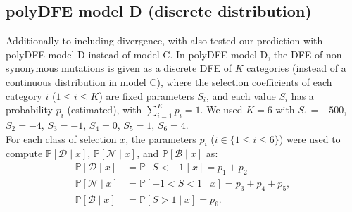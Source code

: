 \documentclass{article}
\newcommand{\proba}{\mathbb{P}}
\newcommand{\Sphyclass}{x}
\newcommand{\given}{\mid}
\newcommand{\Spop}{S}
\newcommand{\SpopDel}{\mathcal{D}}
\newcommand{\SpopNeu}{\mathcal{N}}
\newcommand{\SpopBen}{\mathcal{B}}
\begin{document}
    \subsection{polyDFE model D (discrete distribution)}
    Additionally to including divergence, with also tested our prediction with polyDFE model D instead of model C.
    In polyDFE model D, the DFE of non-synonymous mutations is given as a discrete DFE of $K$ categories (instead of a continuous distribution in model C), where the selection coefficients of each category $i$ ($1 \leq i \leq K$) are fixed parameters $\Spop_i$, and each value $\Spop_i$ has a probability $p_i$ (estimated), with $\sum_{i=1}^{K} p_i =1$.
    We used $K=6$ with $\Spop_1 = -500$, $\Spop_2 = -4$, $\Spop_3 =-1$, $\Spop_4 = 0$, $\Spop_5 = 1$, $\Spop_6 = 4$.\\
    For each class of selection $\Sphyclass$, the parameters $p_i$ ($i \in \{ 1 \leq i \leq 6 \}$) were used to compute $\proba [ \SpopDel \given  \Sphyclass] $, $\proba [ \SpopNeu \given \Sphyclass]$, and $\proba [ \SpopBen \given \Sphyclass]$ as:
    \begin{align}
        \proba [ \SpopDel \given  \Sphyclass] &= \proba [ \Spop < -1 \given \Sphyclass ] = p_1 + p_2 \label{eq:polyProbaDel-mD} \\
        \proba [ \SpopNeu \given \Sphyclass] &= \proba [ -1 < \Spop < 1 \given \Sphyclass ] = p_3 + p_4 + p_5,  \\
        \proba [ \SpopBen \given \Sphyclass] &= \proba [  \Spop > 1 \given \Sphyclass ] = p_6.  \label{eq:polyProbaAdv-mD}
    \end{align}
\end{document}
